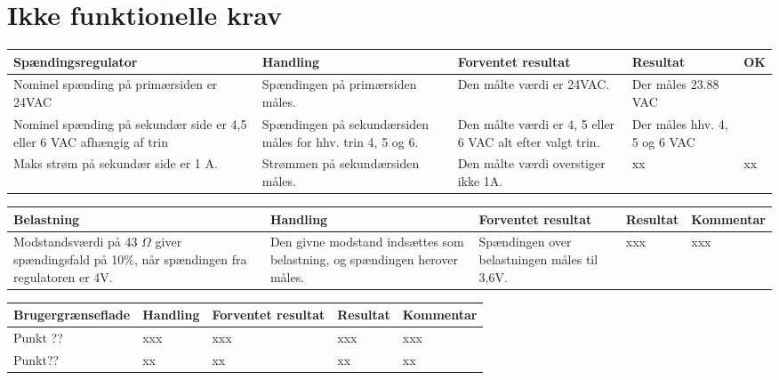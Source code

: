 \section{Ikke funktionelle krav}
\begin{table}[htbp]
	\centering
	\begin{tabular}{|p{4cm}|p{3cm}|p{4cm}|p{3.5cm}|p{1cm}|}
		\hline
		\textbf{Spændingsregulator} & \textbf{Handling} & \textbf{Forventet resultat} & \textbf{Resultat} &\textbf{OK} \\\hline
		Nominel spænding på primærsiden er 24VAC & Spændingen på primærsiden måles. & Den målte værdi er 24VAC. & Der måles 23.88 VAC & \checkmark \\\hline
		Nominel spænding på sekundær side er 4,5 eller 6 VAC afhængig af trin & Spændingen på sekundærsiden måles for hhv. trin 4, 5 og 6. & Den målte værdi er 4, 5 eller 6 VAC alt efter valgt trin. & Der måles hhv. 4, 5 og 6 VAC & \checkmark \\\hline
		Maks strøm på sekundær side er 1 A. & Strømmen på sekundærsiden måles. & Den målte værdi overstiger ikke 1A. & xx  & xx \\\hline
	\end{tabular}
	
\end{table}

\begin{table}[htbp]
	\centering
	\begin{tabular}{|p{4cm}|p{3cm}|p{4cm}|p{2cm}|p{2.5cm}|}
		\hline
		\textbf{Belastning} & \textbf{Handling} & \textbf{Forventet resultat} & \textbf{Resultat} &\textbf{Kommentar} \\\hline
		Modstandsværdi på 43 $\Omega$ giver spændingsfald på 10\%, når spændingen fra regulatoren er 4V. & Den givne modstand indsættes som belastning, og spændingen herover måles. & Spændingen over belastningen måles til 3,6V. & xxx & xxx \\\hline	
	\end{tabular}

	
\end{table}
\begin{table}[htbp]
	\centering
	\begin{tabular}{|p{4cm}|p{3cm}|p{4cm}|p{2cm}|p{2.5cm}|}
		\hline
		\textbf{Brugergrænseflade} & \textbf{Handling} & \textbf{Forventet resultat} & \textbf{Resultat} &\textbf{Kommentar} \\\hline
		Punkt ?? & xxx & xxx & xxx & xxx \\\hline
		Punkt?? & xx & xx & xx & xx \\\hline
		
		
	\end{tabular}

	
\end{table}